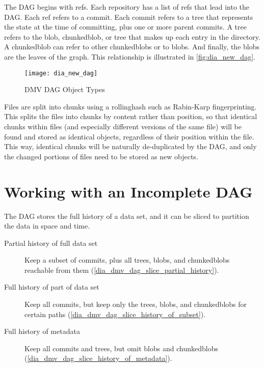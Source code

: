 
The \gls{DAG} begins with \glspl{ref}. Each repository has a list of \glspl{ref}
that lead into the \gls{DAG}. Each \gls{ref} refers to a \gls{commit}. Each
\gls{commit} refers to a \gls{tree} that represents the state at the time of
committing, plus one or more parent \glspl{commit}. A \gls{tree} refers to the
\gls{blob}, \gls{chunkedblob}, or \gls{tree} that makes up each entry in the
directory. A \gls{chunkedblob} can refer to other \glspl{chunkedblob} or to
\glspl{blob}. And finally, the \glspl{blob} are the leaves of the graph. This
relationship is illustrated in \autoref{fig:dia_new_dag}.

\begin{figure}[]
    \centering
        \texttt{[image: dia\_new\_dag]}
    \caption{DMV DAG Object Types}
    \label{fig:dia_new_dag}
\end{figure}


Files are split into chunks using a \gls{rollinghash} such as Rabin-Karp
fingerprinting\cite{rabin_karp_fingerprinting}. This splits the files into
chunks by content rather than position, so that identical chunks within files
(and especially different versions of the same file) will be found and stored as
identical objects, regardless of their position within the file. This way,
identical chunks will be naturally de-duplicated by the \gls{DAG}, and only the
changed portions of files need to be stored as new objects.

%


\section{Working with an Incomplete DAG}
\label{working-with-incomplete-dag}

The \gls{DAG} stores the full history of a data set, and it can be sliced to
partition the data in space and time.

\begin{description}

    \item[Partial history of full data set] Keep a subset of \glspl{commit},
        plus all \glspl{tree}, \glspl{blob}, and \glspl{chunkedblob} reachable
        from them (\autoref{dia_dmv_dag_slice_partial_history}).

    \item[Full history of part of data set] Keep all \glspl{commit}, but keep
        only the \glspl{tree}, \glspl{blob}, and \glspl{chunkedblob} for certain
        paths (\autoref{dia_dmv_dag_slice_history_of_subset}).

    \item[Full history of metadata] Keep all \glspl{commit} and \glspl{tree},
        but omit \glspl{blob} and \glspl{chunkedblob}
        (\autoref{dia_dmv_dag_slice_history_of_metadata}).

\end{description}

